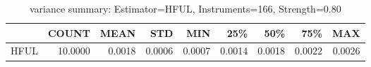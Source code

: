 \begin{table}[ht]
\centering
\caption{variance summary: Estimator=HFUL, Instruments=166, Strength=0.80}
\begin{tabular}{lrrrrrrrr}
\toprule
 & COUNT & MEAN & STD & MIN & 25\% & 50\% & 75\% & MAX \\
\midrule
HFUL & 10.0000 & 0.0018 & 0.0006 & 0.0007 & 0.0014 & 0.0018 & 0.0022 & 0.0026 \\
\bottomrule
\end{tabular}
\end{table}
